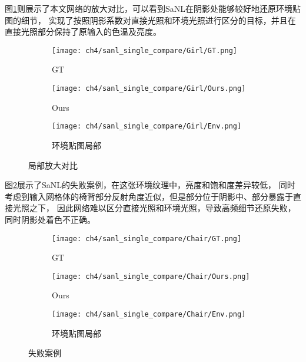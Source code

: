 图\ref{fig:sanl_single_compare}则展示了本文网络的放大对比，可以看到SaNL在阴影处能够较好地还原环境贴图的细节，
实现了按照阴影系数对直接光照和环境光照进行区分的目标，并且在直接光照部分保持了原输入的色温及亮度。

\begin{figure}[H]
  \centering
  \begin{subfigure}[c]{0.23\textwidth}
    \centering
    \texttt{[image: ch4/sanl\_single\_compare/Girl/GT.png]}
    \caption{GT}
  \end{subfigure}
  \begin{subfigure}[c]{0.23\textwidth}
    \centering
    \texttt{[image: ch4/sanl\_single\_compare/Girl/Ours.png]}
    \caption{Ours}
  \end{subfigure}
  \hspace{0.05\textwidth} %
  \begin{subfigure}[c]{0.23\textwidth}
    \centering
    \texttt{[image: ch4/sanl\_single\_compare/Girl/Env.png]}
    \caption{环境贴图局部}
  \end{subfigure}
  \caption{局部放大对比}
  \label{fig:sanl_single_compare}
\end{figure}

图\ref{fig:sanl_single_compare_failure}展示了SaNL的失败案例，在这张环境纹理中，亮度和饱和度差异较低，
同时考虑到输入网格体的椅背部分反射角度近似，但是部分位于阴影中、部分暴露于直接光照之下，
因此网络难以区分直接光照和环境光照，导致高频细节还原失败，同时阴影处着色不正确。

\begin{figure}[H]
  \centering
  \begin{subfigure}[c]{0.23\textwidth}
    \centering
    \texttt{[image: ch4/sanl\_single\_compare/Chair/GT.png]}
    \caption{GT}
  \end{subfigure}
  \begin{subfigure}[c]{0.23\textwidth}
    \centering
    \texttt{[image: ch4/sanl\_single\_compare/Chair/Ours.png]}
    \caption{Ours}
  \end{subfigure}
  \hspace{0.05\textwidth} %
  \begin{subfigure}[c]{0.23\textwidth}
    \centering
    \texttt{[image: ch4/sanl\_single\_compare/Chair/Env.png]}
    \caption{环境贴图局部}
  \end{subfigure}
  \caption{失败案例}
  \label{fig:sanl_single_compare_failure}
\end{figure}

